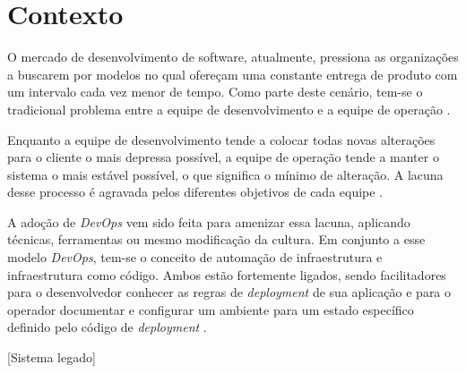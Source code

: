 \section{Contexto}
\label{sec:contexto}

O mercado de desenvolvimento de software, atualmente, pressiona as organizações
a buscarem por modelos no qual ofereçam uma constante entrega de produto com
um intervalo cada vez menor de tempo. Como parte deste cenário, tem-se o
tradicional problema entre a equipe de desenvolvimento e a equipe de operação
\cite{hummer:2013}.

Enquanto a equipe de desenvolvimento tende a colocar todas novas alterações
para o cliente o mais depressa possível, a equipe de operação tende a manter
o sistema o mais estável possível, o que significa o mínimo de alteração.
A lacuna desse processo é agravada pelos diferentes objetivos de cada equipe
\cite{huttermann:2012}.

A adoção de \textit{DevOps} vem sido feita para amenizar essa lacuna, aplicando
técnicas, ferramentas ou mesmo modificação da cultura. Em conjunto a esse modelo
\textit{DevOps}, tem-se o conceito de automação de infraestrutura e infraestrutura
como código. Ambos estão fortemente ligados, sendo facilitadores para o desenvolvedor
conhecer as regras de \textit{deployment} de sua aplicação e para o operador
documentar e configurar um ambiente para um estado específico definido pelo código
de \textit{deployment} \cite{hummer:2013}.

[Sistema legado]
